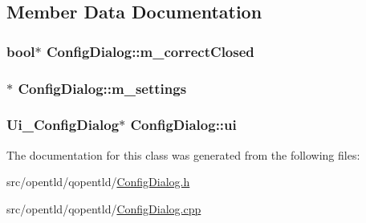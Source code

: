 \subsection{Member Data Documentation}
\hypertarget{classConfigDialog_a49a00b0b82e40c2e26ddb3702438f3ff}{
\subsubsection[{m\-\_\-correct\-Closed}]{\setlength{\rightskip}{0pt plus 5cm}bool$\ast$ Config\-Dialog\-::m\-\_\-correct\-Closed\hspace{0.3cm}{\ttfamily [private]}}}\label{classConfigDialog_a49a00b0b82e40c2e26ddb3702438f3ff}
\hypertarget{classConfigDialog_aebf816c83d7aa4a3bff2b3e1e16ccb6d}{
\subsubsection[{m\-\_\-settings}]{$\ast$ Config\-Dialog\-::m\-\_\-settings\hspace{0.3cm}{\ttfamily [private]}}}\label{classConfigDialog_aebf816c83d7aa4a3bff2b3e1e16ccb6d}
\hypertarget{classConfigDialog_a0f0ed746b2d7583be3869a363b91136c}{
\subsubsection[{ui}]{\setlength{\rightskip}{0pt plus 5cm}Ui\-\_\-\-Config\-Dialog$\ast$ Config\-Dialog\-::ui\hspace{0.3cm}{\ttfamily [private]}}}\label{classConfigDialog_a0f0ed746b2d7583be3869a363b91136c}


The documentation for this class was generated from the following files\-:\begin{DoxyCompactItemize}
\item 
src/opentld/qopentld/\hyperlink{ConfigDialog_8h}{Config\-Dialog.\-h}\item 
src/opentld/qopentld/\hyperlink{ConfigDialog_8cpp}{Config\-Dialog.\-cpp}\end{DoxyCompactItemize}
